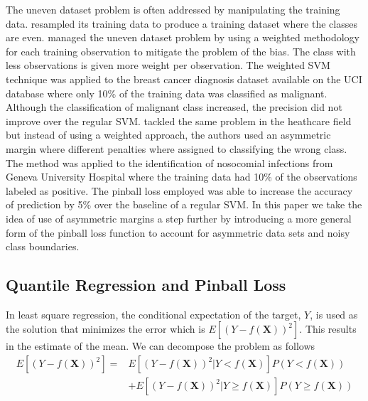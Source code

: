\documentclass[twoside,11pt]{article}
\begin{document}
The uneven dataset problem is often addressed by manipulating the training data. \citet{Liou08} resampled its training data to produce a training dataset where the classes are even. \citet{Huang05} managed the uneven dataset problem by using a weighted methodology for each training observation to mitigate the problem of the bias. The class with less observations is given more weight per observation. The weighted SVM technique was applied to the breast cancer diagnosis dataset available on the UCI database where only 10\% of the training data was classified as malignant. Although the classification of malignant class increased, the precision did not improve over the regular SVM. \citet{Cohen03} tackled the same problem in the heathcare field but instead of using a weighted approach, the authors used an asymmetric margin where different penalties where assigned to classifying the wrong class. The method was applied to the identification of nosocomial infections from Geneva University Hospital where the training data had 10\% of the observations labeled as positive. The pinball loss employed was able to increase the accuracy of prediction by 5\% over the baseline of a regular SVM. In this paper we take the idea of \citet{Cohen03} use of asymmetric margins a step further by introducing a more general form of the pinball loss function to account for asymmetric data sets and noisy class boundaries. 

\subsection{Quantile Regression and Pinball Loss}
In least square regression, the conditional expectation of the target, $Y$, is used as the solution that minimizes the error which is $E[(Y-f(\mathbf{X}))^2]$. This results in the estimate of the mean. We can decompose the problem as follows
\begin{equation}
\begin{array}{cc}
 E[(Y-f(\mathbf{X}))^2]=& E[(Y-f(\mathbf{X}))^2|Y<f(\mathbf{X})]P(Y<f(\mathbf{X}))\\
 &+E[(Y-f(\mathbf{X}))^2|Y \geq f(\mathbf{X})]P(Y \geq f(\mathbf{X}))
 \end{array}
\end{equation}
\end{document}
